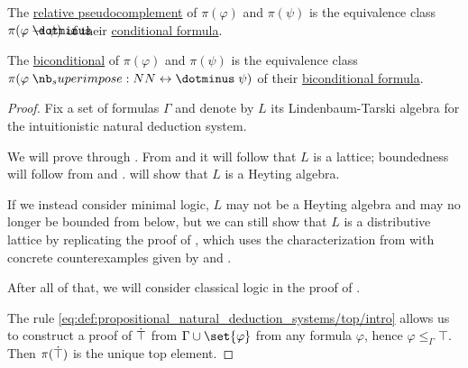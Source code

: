 \begin{proposition}
\begin{thmenum}[resume=thm:lindenbaum_tarski_algebras]
     The \hyperref[def:heyting_algebra]{relative pseudocomplement} of \( \pi(\varphi) \) and \( \pi(\psi) \) is the equivalence class \( \pi(\varphi \synimplies \psi) \) of their \hyperref[def:propositional_alphabet/connectives/conditional]{conditional formula}.

     The \hyperref[def:heyting_algebra/biconditional]{biconditional} of \( \pi(\varphi) \) and \( \pi(\psi) \) is the equivalence class \( \pi(\varphi \syniff \psi) \) of their \hyperref[def:propositional_alphabet/connectives/biconditional]{biconditional formula}.
  \end{thmenum}
\end{proposition}
\begin{proof}
  Fix a set of formulas \( \Gamma \) and denote by \( L \) its Lindenbaum-Tarski algebra for the intuitionistic natural deduction system.

  We will prove  through . From  and  it will follow that \( L \) is a lattice; boundedness will follow from  and .  will show that \( L \) is a Heyting algebra.

  If we instead consider minimal logic, \( L \) may not be a Heyting algebra and may no longer be bounded from below, but we can still show that \( L \) is a distributive lattice by replicating the proof of , which uses the characterization from  with concrete counterexamples given by  and .

  After all of that, we will consider classical logic in the proof of .

   The rule \ref{eq:def:propositional_natural_deduction_systems/top/intro} allows us to construct a proof of \( \dot\top \) from \( \Gamma \cup \set{ \varphi } \) from any formula \( \varphi \), hence \( \varphi \leq_\Gamma \top \). Then \( \pi(\dot\top) \) is the unique top element.


\end{proof}
